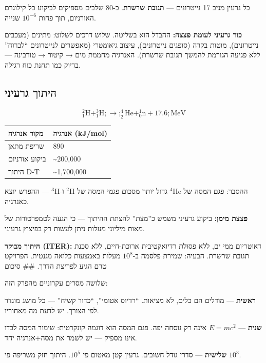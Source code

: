 \documentclass[
  hebrew,
  letterpaper,
  DIV=11,
  numbers=noendperiod]{scrreprt}
\newcounter{none} %
\begin{document}
כל גרעין מניב 17 נייטרונים --- \textbf{תגובת שרשרת}. כ-80 שלבים מספיקים
לביקוע כל קילוגרם האורניום, תוך פחות \(10^{-6}\) שנייה.

\textbf{כור גרעיני לעומת פצצה:} ההבדל הוא בשליטה. שלוש דרכים לשלוט:
מתינים (מעכבים נייטרונים), מוטות בקרה (סופגים נייטרונים), עיצוב גיאומטרי
(מאפשרים לנייטרונים ``לברוח'' ללא פגיעה הגורמת להמשך תגובת שרשרת).
האנרגיה מחממת מים → קיטור → טורבינה --- בדיוק כמו תחנת כוח רגילה.

\subsection{היתוך
גרעיני}\label{ux5d4ux5d9ux5eaux5d5ux5da-ux5d2ux5e8ux5e2ux5d9ux5e0ux5d9}

\[^2_1\text{H} + ^3_1\text{H} ;\to; ^4_2\text{He} + ^1_0\text{n} + 17.6;\text{MeV}\]

{\def\LTcaptype{none} %
\begin{longtable}[]{@{}ll@{}}
\toprule\noalign{}
מקור אנרגיה & אנרגיה (kJ/mol) \\
\midrule\noalign{}
\endhead
\bottomrule\noalign{}
\endlastfoot
שריפת מתאן & 890 \\
ביקוע אורניום & \textasciitilde200,000 \\
היתוך D-T & \textasciitilde1,700,000 \\
\end{longtable}
}

ההסבר: פגם המסה של \(^4\text{He}\) גדול יותר מסכום פגמי המסה של
\(^2\text{H}\) ו-\(^3\text{H}\) --- ההפרש יוצא כאנרגיה.

\textbf{פצצת מימן:} ביקוע גרעיני משמש כ''מצת'' להצתת ההיתוך --- כי הגעה
לטמפרטורות של מאות מיליוני מעלות ניתן לעשות רק בפיצוץ גרעיני.

\textbf{היתוך מבוקר (ITER):} דאוטריום ממי ים, ללא פסולת רדיואקטיבית
ארוכת-חיים, ללא סכנת תגובת שרשרת. הבעיה: שמירת פלסמה ב-\(10^8\) מעלות
באמצעות כלואה מגנטית. הפרויקט טרם הגיע לפריצת הדרך. \#\# סיכום

שלושה מסרים עקרוניים מהפרק הזה:

\textbf{ראשית} --- מודלים הם כלים, לא מציאות. ``רדיוס אטומי'', ``כדור
קשיח'' --- כל מושג מוגדר לפי הצורך. יש לדעת מה מאחוריו.

\textbf{שנית} --- \(E = mc^2\) אינה רק נוסחה יפה. פגם המסה הוא דוגמה
קונקרטית: שימור המסה לבדו אינו מספיק --- יש לשמר את מסה+אנרגיה יחד.

\textbf{שלישית} --- סדרי גודל חשובים. גרעין קטן מאטום פי \(10^5\). היתוך
חזק משריפה פי \(10^3\).
\end{document}
